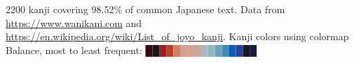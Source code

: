 2200 kanji covering 98.52\% of common Japanese text. Data from \url{https://www.wanikani.com} and \url{https://en.wikipedia.org/wiki/List_of_joyo_kanji}. Kanji colors using colormap Balance, most to least frequent: \textcolor[HTML]{3c0912}{█}\textcolor[HTML]{830e29}{█}\textcolor[HTML]{a11d25}{█}\textcolor[HTML]{b74029}{█}\textcolor[HTML]{cd8268}{█}\textcolor[HTML]{d69f8d}{█}\textcolor[HTML]{d2a293}{█}\textcolor[HTML]{c8a59d}{█}\textcolor[HTML]{a3bac2}{█}\textcolor[HTML]{91b7c3}{█}\textcolor[HTML]{68a4bc}{█}\textcolor[HTML]{408dba}{█}\textcolor[HTML]{1059be}{█}\textcolor[HTML]{29409e}{█}\textcolor[HTML]{242e6c}{█}\textcolor[HTML]{181c43}{█}